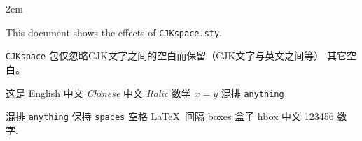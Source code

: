 \documentclass[11pt]{article}
\begin{document}
\parindent 2em

\begin{CJK*}{UTF8}{gbsn}

  This document shows the effects of \texttt{CJKspace.sty}.

  \verb+CJKspace+ 包仅忽略CJK文字之间的空白而保留（CJK文字与英文之间等）
  其它空白。

  这是 English 中文 \textit{Chinese} 中文 {\itshape Italic} 数学 $x=y$
  混排 \verb+anything+

  混排 \verb+anything+ 保持 \texttt{spaces} 空格 \LaTeX\ 间隔
  \mbox{boxes} 盒子 \hbox{hbox} 中文 123456 数字.

\end{CJK*}
\end{document}
